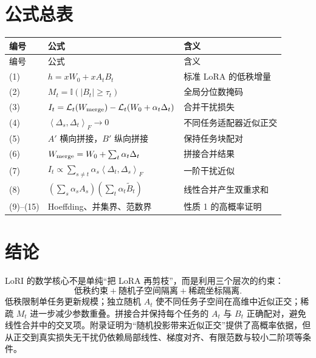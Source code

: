 \documentclass[UTF8,12pt,a4paper,fontset=none]{ctexart}
\numberwithin{equation}{section}
\newcommand{\ip}[2]{\left\langle #1,#2\right\rangle_F}
\newcommand{\Loss}{\mathcal{L}}
\begin{document}
\section{公式总表}

\begin{longtable}{p{}p{}p{}}
\toprule
编号 & 公式 & 含义\\
\midrule
\endfirsthead
\toprule
编号 & 公式 & 含义\\
\midrule
\endhead
(1) & $h=xW_0+xA_tB_t$ & 标准 LoRA 的低秩增量\\
(2) & $M_t=\mathbb I(|B_t|\ge\tau_t)$ & 全局分位数掩码\\
(3) & $I_t=\Loss_t(W_{\rm merge})-\Loss_t(W_0+\alpha_t\Delta_t)$ & 合并干扰损失\\
(4) & $\ip{\Delta_s}{\Delta_t}\to0$ & 不同任务适配器近似正交\\
(5) & $A'$ 横向拼接，$B'$ 纵向拼接 & 保持任务块配对\\
(6) & $W_{\rm merge}=W_0+\sum_t\alpha_t\Delta_t$ & 拼接合并结果\\
(7) & $I_t\propto\sum_{s\ne t}\alpha_s\ip{\Delta_t}{\Delta_s}$ & 一阶干扰近似\\
(8) & $(\sum_s\alpha_sA_s)(\sum_t\alpha_t\widetilde B_t)$ & 线性合并产生双重求和\\
(9)--(15) & Hoeffding、并集界、范数界 & 性质 1 的高概率证明\\
\bottomrule
\end{longtable}

\section*{结论}

LoRI 的数学核心不是单纯“把 LoRA 再剪枝”，而是利用三个层次的约束：
\begin{equation}
  \boxed{
  \text{低秩约束}
  +\text{随机子空间隔离}
  +\text{稀疏坐标隔离}
  }.
\end{equation}
低秩限制单任务更新规模；独立随机 $A_t$ 使不同任务子空间在高维中近似正交；稀疏 $M_t$ 进一步减少参数重叠。拼接合并保持每个任务的 $A_t$ 与 $B_t$ 正确配对，避免线性合并中的交叉项。附录证明为“随机投影带来近似正交”提供了高概率依据，但从正交到真实损失无干扰仍依赖局部线性、梯度对齐、有限范数与较小二阶项等条件。
\end{document}

